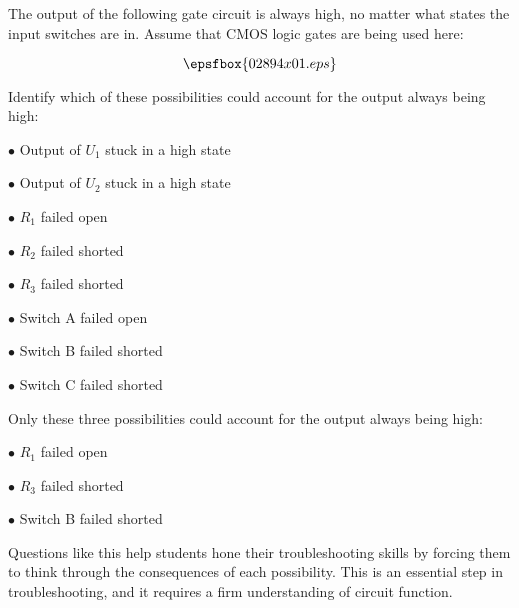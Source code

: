 

The output of the following gate circuit is always high, no matter what states the input switches are in.  Assume that CMOS logic gates are being used here:

$$\epsfbox{02894x01.eps}$$

Identify which of these possibilities could account for the output always being high:

\medskip
\goodbreak
\item{$\bullet$} Output of $U_1$ stuck in a high state
\item{$\bullet$} Output of $U_2$ stuck in a high state
\item{$\bullet$} $R_1$ failed open
\item{$\bullet$} $R_2$ failed shorted
\item{$\bullet$} $R_3$ failed shorted
\item{$\bullet$} Switch A failed open
\item{$\bullet$} Switch B failed shorted
\item{$\bullet$} Switch C failed shorted
\medskip







Only these three possibilities could account for the output always being high:

\medskip
\goodbreak
\item{$\bullet$} $R_1$ failed open
\item{$\bullet$} $R_3$ failed shorted
\item{$\bullet$} Switch B failed shorted
\medskip







Questions like this help students hone their troubleshooting skills by forcing them to think through the consequences of each possibility.  This is an essential step in troubleshooting, and it requires a firm understanding of circuit function.




